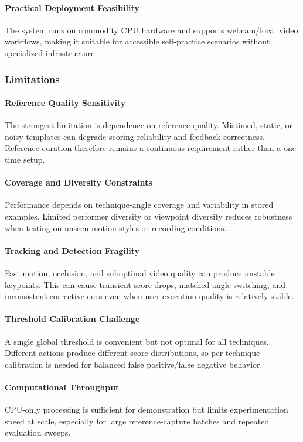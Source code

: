 \documentclass[12pt]{article}
\begin{document}
{\paragraph{Practical Deployment Feasibility}
The system runs on commodity CPU hardware and supports webcam/local video workflows, making it suitable for accessible self-practice scenarios without specialized infrastructure.

\subsubsection{Limitations}

\paragraph{Reference Quality Sensitivity}
The strongest limitation is dependence on reference quality. Mistimed, static, or noisy templates can degrade scoring reliability and feedback correctness. Reference curation therefore remains a continuous requirement rather than a one-time setup.

\paragraph{Coverage and Diversity Constraints}
Performance depends on technique-angle coverage and variability in stored examples. Limited performer diversity or viewpoint diversity reduces robustness when testing on unseen motion styles or recording conditions.

\paragraph{Tracking and Detection Fragility}
Fast motion, occlusion, and suboptimal video quality can produce unstable keypoints. This can cause transient score drops, matched-angle switching, and inconsistent corrective cues even when user execution quality is relatively stable.

\paragraph{Threshold Calibration Challenge}
A single global threshold is convenient but not optimal for all techniques. Different actions produce different score distributions, so per-technique calibration is needed for balanced false positive/false negative behavior.

\paragraph{Computational Throughput}
CPU-only processing is sufficient for demonstration but limits experimentation speed at scale, especially for large reference-capture batches and repeated evaluation sweeps.

}
\end{document}
